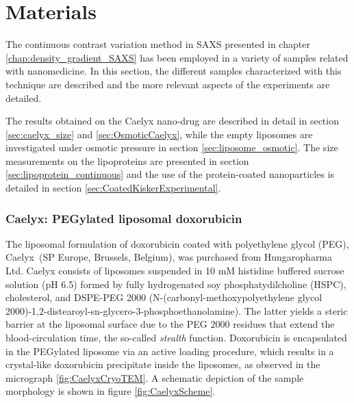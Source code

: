 \section{Materials}

The continuous contrast variation method in SAXS presented in chapter \ref{chap:density_gradient_SAXS} has been employed in a variety of samples related with nanomedicine. In this section, the different samples characterized with this technique are described and the more relevant aspects of the experiments are detailed. 

The results obtained on the Caelyx nano-drug are described in detail in section \ref{sec:caelyx_size} and \ref{sec:OsmoticCaelyx}, while the empty liposomes are investigated under osmotic pressure in section \ref{sec:liposome_osmotic}. The size measurements on the lipoproteins are presented in section \ref{sec:lipoprotein_continuous} and the use of the protein-coated nanoparticles is detailed in section \ref{sec:CoatedKiskerExperimental}.

\subsubsection{Caelyx: PEGylated liposomal doxorubicin}
\label{sec:materials_caelyx}
The liposomal formulation of doxorubicin coated with polyethylene glycol (PEG), Caelyx\textregistered\ (SP Europe, Brussels, Belgium), was purchased from Hungaropharma Ltd. Caelyx consists of liposomes suspended in 10 mM histidine buffered sucrose solution (pH 6.5) formed by fully hydrogenated soy phosphatydilcholine (HSPC), cholesterol, and DSPE-PEG 2000 (N-(carbonyl-methoxypolyethylene glycol 2000)-1,2-distearoyl-sn-glycero-3-phosphoethanolamine). The latter yields a steric barrier at the liposomal surface due to the PEG 2000 residues that extend the blood-circulation time, the so-called \emph{stealth} function. Doxorubicin is encapsulated in the PEGylated liposome via an active loading procedure, which results in a crystal-like doxorubicin precipitate inside the liposomes, as observed in the micrograph \ref{fig:CaelyxCryoTEM}. A schematic depiction of the sample morphology is shown in figure \ref{fig:CaelyxScheme}. 

